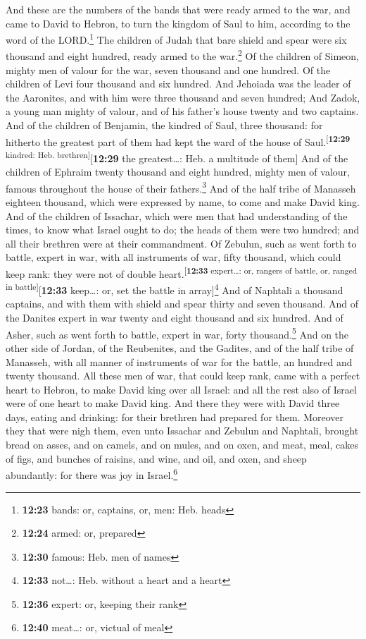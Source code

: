  And these are the numbers of the bands that were ready
armed to the war, and came to David to Hebron, to turn the kingdom of
Saul to him, according to the word of the LORD.\footnote{\textbf{12:23}
  bands: or, captains, or, men: Heb. heads}  The children
of Judah that bare shield and spear were six thousand and eight hundred,
ready armed to the war.\footnote{\textbf{12:24} armed: or, prepared}
 Of the children of Simeon, mighty men of valour for the
war, seven thousand and one hundred.  Of the children of
Levi four thousand and six hundred.  And Jehoiada was the
leader of the Aaronites, and with him were three thousand and seven
hundred;  And Zadok, a young man mighty of valour, and of
his father's house twenty and two captains.  And of the
children of Benjamin, the kindred of Saul, three thousand: for hitherto
the greatest part of them had kept the ward of the house of
Saul.\textsuperscript{{[}\textbf{12:29} kindred: Heb.
brethren{]}}{[}\textbf{12:29} the greatest\ldots: Heb. a multitude of
them{]}  And of the children of Ephraim twenty thousand
and eight hundred, mighty men of valour, famous throughout the house of
their fathers.\footnote{\textbf{12:30} famous: Heb. men of names}
 And of the half tribe of Manasseh eighteen thousand,
which were expressed by name, to come and make David king.
 And of the children of Issachar, which were men that had
understanding of the times, to know what Israel ought to do; the heads
of them were two hundred; and all their brethren were at their
commandment.  Of Zebulun, such as went forth to battle,
expert in war, with all instruments of war, fifty thousand, which could
keep rank: they were not of double
heart.\textsuperscript{{[}\textbf{12:33} expert\ldots: or, rangers of
battle, or, ranged in battle{]}}{[}\textbf{12:33} keep\ldots: or, set
the battle in array{]}\footnote{\textbf{12:33} not\ldots: Heb. without a
  heart and a heart}  And of Naphtali a thousand
captains, and with them with shield and spear thirty and seven thousand.
 And of the Danites expert in war twenty and eight
thousand and six hundred.  And of Asher, such as went
forth to battle, expert in war, forty thousand.\footnote{\textbf{12:36}
  expert: or, keeping their rank}  And on the other side
of Jordan, of the Reubenites, and the Gadites, and of the half tribe of
Manasseh, with all manner of instruments of war for the battle, an
hundred and twenty thousand.  All these men of war, that
could keep rank, came with a perfect heart to Hebron, to make David king
over all Israel: and all the rest also of Israel were of one heart to
make David king.  And there they were with David three
days, eating and drinking: for their brethren had prepared for them.
 Moreover they that were nigh them, even unto Issachar
and Zebulun and Naphtali, brought bread on asses, and on camels, and on
mules, and on oxen, and meat, meal, cakes of figs, and bunches of
raisins, and wine, and oil, and oxen, and sheep abundantly: for there
was joy in Israel.\footnote{\textbf{12:40} meat\ldots: or, victual of
  meal}

